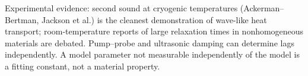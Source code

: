\begin{summarybox}[Summary]
Experimental evidence: second sound at cryogenic temperatures (Ackerman--Bertman, Jackson et al.) is the cleanest demonstration of wave-like heat transport; room-temperature reports of large relaxation times in nonhomogeneous materials are debated. Pump--probe and ultrasonic damping can determine lags independently. A model parameter not measurable independently of the model is a fitting constant, not a material property.
\end{summarybox}

